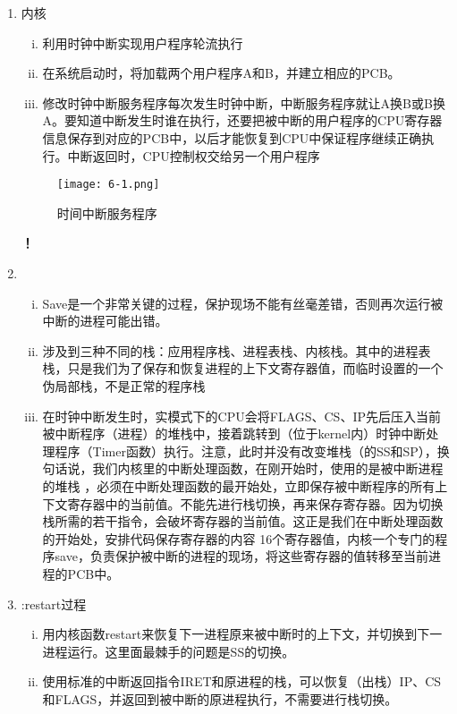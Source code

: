 \documentclass[UTF8]{article}
\newcommand{\red}{\color{red}}
\begin{document}
\begin{enumerate}[1)]
		\item 内核
			\begin{enumerate}[i)]
					\item 利用时钟中断实现用户程序轮流执行 
					\item 在系统启动时，将加载两个用户程序A和B，并建立相应的PCB。
					\item 修改时钟中断服务程序每次发生时钟中断，中断服务程序就让A换B或B换A。要知道中断发生时谁在执行，还要把被中断的用户程序的CPU寄存器信息保存到对应的PCB中，以后才能恢复到CPU中保证程序继续正确执行。中断返回时，CPU控制权交给另一个用户程序
			\end{enumerate}
		\begin{figure}[htbp]
			\centering
			\texttt{[image: 6-1.png]}
			\caption{时间中断服务程序}
		\end{figure}
		{\noindent\heiti\bfseries{}！}
		\item {\red{}}
			\begin{enumerate}[i)]
					\item Save是一个非常关键的过程，保护现场不能有丝毫差错，否则再次运行被中断的进程可能出错。
					\item 涉及到三种不同的栈：应用程序栈、进程表栈、内核栈。其中的进程表栈，只是我们为了保存和恢复进程的上下文寄存器值，而临时设置的一个伪局部栈，不是正常的程序栈
					\item 在时钟中断发生时，实模式下的CPU会将FLAGS、CS、IP先后压入当前被中断程序（进程）的堆栈中，接着跳转到（位于kernel内）时钟中断处理程序（Timer函数）执行。注意，此时并没有改变堆栈（的SS和SP），换句话说，我们内核里的中断处理函数，在刚开始时，使用的是被中断进程的堆栈
					，必须在中断处理函数的最开始处，立即保存被中断程序的所有上下文寄存器中的当前值。不能先进行栈切换，再来保存寄存器。因为切换栈所需的若干指令，会破坏寄存器的当前值。这正是我们在中断处理函数的开始处，安排代码保存寄存器的内容
					16个寄存器值，内核一个专门的程序save，负责保护被中断的进程的现场，将这些寄存器的值转移至当前进程的PCB中。
			\end{enumerate}

		\item {\red{}:restart过程 }
			\begin{enumerate}[i)]
					\item 用内核函数restart来恢复下一进程原来被中断时的上下文，并切换到下一进程运行。这里面最棘手的问题是SS的切换。

					\item 使用标准的中断返回指令IRET和原进程的栈，可以恢复（出栈）IP、CS和FLAGS，并返回到被中断的原进程执行，不需要进行栈切换。


\end{enumerate}
\end{enumerate}
\end{document}
